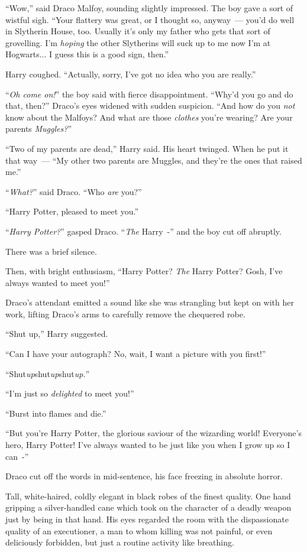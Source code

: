 ``Wow,'' said Draco Malfoy, sounding slightly impressed. The boy gave a sort of wistful sigh. ``Your flattery was great, or I thought so, anyway~--- you'd do well in Slytherin House, too. Usually it's only my father who gets that sort of grovelling. I'm \emph{hoping} the other Slytherins will suck up to me now I'm at Hogwarts... I guess this is a good sign, then.''

Harry coughed. ``Actually, sorry, I've got no idea who you are really.''

``\emph{Oh come on!}'' the boy said with fierce disappointment. ``Why'd you go and do that, then?'' Draco's eyes widened with sudden suspicion. ``And how do you \emph{not} know about the Malfoys? And what are those \emph{clothes} you're wearing? Are your parents \emph{Muggles?}''

``Two of my parents are dead,'' Harry said. His heart twinged. When he put it that way~--- ``My other two parents are Muggles, and they're the ones that raised me.''

``\emph{What?}'' said Draco. ``Who \emph{are} you?''

``Harry Potter, pleased to meet you.''

``\emph{Harry Potter?}'' gasped Draco. ``\emph{The} Harry~-'' and the boy cut off abruptly.

There was a brief silence.

Then, with bright enthusiasm, ``Harry Potter? \emph{The} Harry Potter? Gosh, I've always wanted to meet you!''

Draco's attendant emitted a sound like she was strangling but kept on with her work, lifting Draco's arms to carefully remove the chequered robe.

``Shut up,'' Harry suggested.

``Can I have your autograph? No, wait, I want a picture with you first!''

``Shut\emph{up}shut\emph{up}shut\emph{up.}''

``I'm just so \emph{delighted} to meet you!''

``Burst into flames and die.''

``But you're Harry Potter, the glorious saviour of the wizarding world! Everyone's hero, Harry Potter! I've always wanted to be just like you when I grow up so I can~-''

Draco cut off the words in mid-sentence, his face freezing in absolute horror.

Tall, white-haired, coldly elegant in black robes of the finest quality. One hand gripping a silver-handled cane which took on the character of a deadly weapon just by being in that hand. His eyes regarded the room with the dispassionate quality of an executioner, a man to whom killing was not painful, or even deliciously forbidden, but just a routine activity like breathing.

